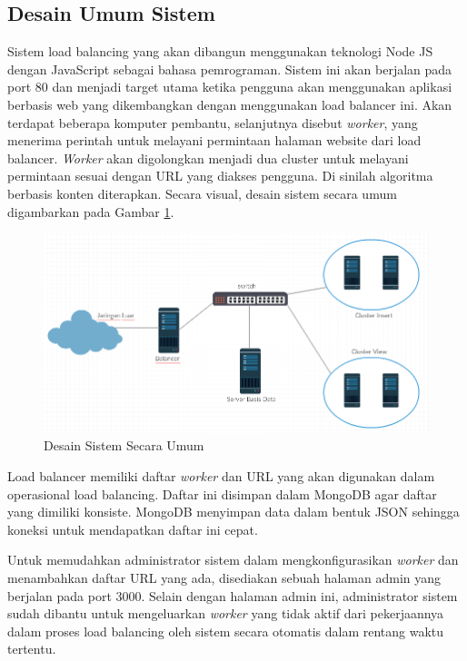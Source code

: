 \documentclass{ta-its}
\begin{document}
		    \subsection{Desain Umum Sistem}
			    Sistem load balancing yang akan dibangun menggunakan teknologi Node JS dengan JavaScript sebagai bahasa pemrograman. Sistem ini akan berjalan pada port 80 dan menjadi target utama ketika pengguna akan menggunakan aplikasi berbasis web yang dikembangkan dengan menggunakan load balancer ini. Akan terdapat beberapa komputer pembantu, selanjutnya disebut \textit{worker}, yang menerima perintah untuk melayani permintaan halaman website dari load balancer. \textit{Worker} akan digolongkan menjadi dua cluster untuk melayani permintaan sesuai dengan URL yang diakses pengguna. Di sinilah algoritma berbasis konten diterapkan. Secara visual, desain sistem secara umum digambarkan pada Gambar \ref{gambarSistem}.
			    
			    \begin{figure}[h] %
			    	\centering
			    	\includegraphics[width=\linewidth]{contoh_img/sistem}
			    	\caption{Desain Sistem Secara Umum}
			    	\label{gambarSistem}
			    \end{figure}
			    
			    Load balancer memiliki daftar \textit{worker} dan URL yang akan digunakan dalam operasional load balancing. Daftar ini disimpan dalam MongoDB agar daftar yang dimiliki konsiste. MongoDB menyimpan data dalam bentuk JSON sehingga koneksi untuk mendapatkan daftar ini cepat.
			    
			    Untuk memudahkan administrator sistem dalam mengkonfigurasikan \textit{worker} dan menambahkan daftar URL yang ada, disediakan sebuah halaman admin yang berjalan pada port 3000. Selain dengan halaman admin ini, administrator sistem sudah dibantu untuk mengeluarkan \textit{worker} yang tidak aktif dari pekerjaannya dalam proses load balancing oleh sistem secara otomatis dalam rentang waktu tertentu.
			    
\end{document}
